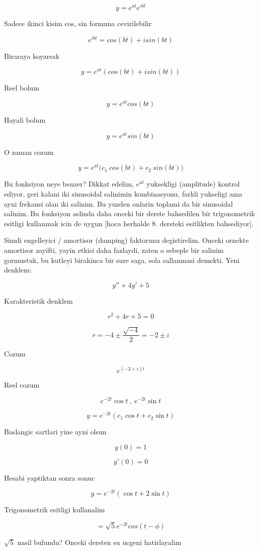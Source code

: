 \documentclass[12pt,fleqn]{article}\usepackage{../common}
\begin{document}
\[ y = e^{at} e^{ibt} \]

Sadece ikinci kisim cos, sin formuna cevirilebilir

\[ e^{ibt} = cos(bt) + isin(bt) \]

Biraraya koyarsak

\[ y = e^{at} (cos(bt) + isin(bt)) \]

Reel bolum

\[ y = e^{at}cos(bt) \] 

Hayali bolum

\[ y = e^{at}sin(bt) \] 

O zaman cozum

\[ y = e^{at} \bigg( c_1 \ cos(bt) + c_2 \ sin(bt) \bigg) \]

Bu fonksiyon neye benzer? Dikkat edelim, $e^{at}$ yuksekligi (amplitude)
kontrol ediyor, geri kalani iki sinusoidal salinimin kombinasyonu, farkli
yukseligi ama ayni frekansi olan iki salinim. Bu yuzden onlarin toplami da
bir sinusoidal salinim. Bu fonksiyon aslinda daha onceki bir derste
bahsedilen bir trigonometrik esitligi kullanmak icin de uygun [hoca
herhalde 8. dersteki esitlikten bahsediyor].

Simdi engelleyici / amortisor (damping) faktorunu degistirelim. Onceki
ornekte amortisor zayifti, yayin etkisi daha fazlaydi, zaten o sebeple bir
salinim gormustuk, bu kutleyi birakinca bir sure saga, sola sallanmasi
demekti. Yeni denklem:

\[ y'' + 4y' + 5 \]

Karakteristik denklem

\[ r^2 + 4r + 5 = 0 \]

\[ r = -4 \pm \frac{\sqrt{-4}}{2} = -2 \pm i\]

Cozum

\[ e^{(-2+i)t} \]

Reel cozum

\[ e^{-2t}\cos t \ , \ e^{-2t}\sin t\]

\[ y = e^{-2t} (c_1 \cos t + c_2 \sin t) \]

Baslangic sartlari yine ayni olsun

\[ y(0) = 1 \]

\[ y'(0) = 0 \]

Hesabi yaptiktan sonra sonuc

\[ y = e^{-2t} (\cos t + 2 \sin t) \]

Trigonometrik esitligi kullanalim

\[ = \sqrt{5}e^{-2t} cos (t - \phi) \]

$\sqrt{5}$ nasil bulundu? Onceki dersten su ucgeni hatirlayalim
\end{document}
